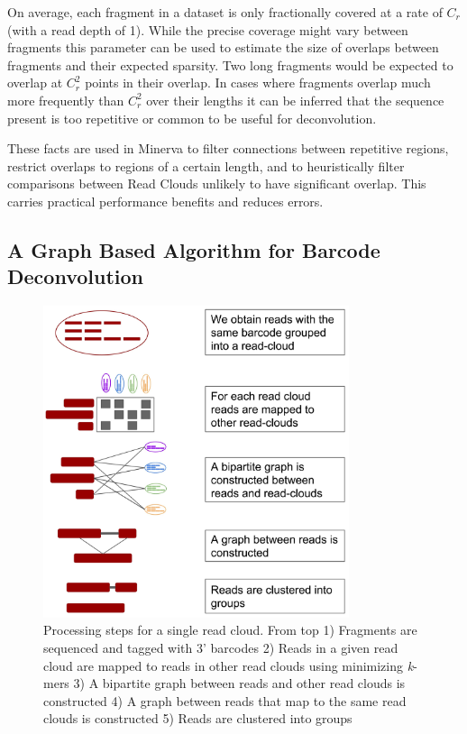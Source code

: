 On average, each fragment in a dataset is only fractionally covered at a rate of $C_r$ (with a read depth of 1). While the precise coverage might vary between fragments this parameter can be used to estimate the size of overlaps between fragments and their expected sparsity. Two long fragments would be expected to overlap at $C_r^2$ points in their overlap. In cases where fragments overlap much more frequently than $C_r^2$ over their lengths it can be inferred that the sequence present is too repetitive or common to be useful for deconvolution. 

These facts are used in Minerva to filter connections between repetitive regions, restrict overlaps to regions of a certain length, and to heuristically filter comparisons between Read Clouds unlikely to have significant overlap. This carries practical performance benefits and reduces errors.

\subsection*{A Graph Based Algorithm for Barcode Deconvolution}
\label{sec:graph-model}

\begin{figure}
  \begin{center}
    \includegraphics[width=0.8\textwidth]{figures/algorithm_figure.jpg}
	\caption{\small{Processing steps for a single read cloud. From top 1) Fragments are sequenced and tagged with 3' barcodes 2) Reads in a given read cloud are mapped to reads in other read clouds using minimizing \textit{k}-mers 3) A bipartite graph between reads and other read clouds is constructed 4) A graph between reads that map to the same read clouds is constructed 5) Reads are clustered into groups  }}
    \label{fig:pipe}
  \end{center}
\end{figure}

